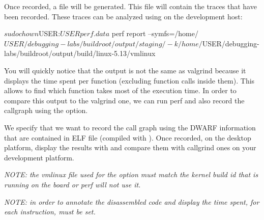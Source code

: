 Once recorded, a  file will be generated. This file will
contain the traces that have been recorded. These traces can be analyzed using
 on the development host:

\begin{bashinput}
$ sudo chown $USER:$USER perf.data
$ perf report --symfs=/home/$USER/debugging-labs/buildroot/output/staging/
    -k /home/$USER/debugging-labs/buildroot/output/build/linux-5.13/vmlinux
\end{bashinput}

You will quickly notice that the output is not the same as valgrind because it
displays the time spent per function (excluding function calls inside them).
This allows to find which function takes most of the execution time. In order to
compare this output to the valgrind one, we can run perf and also record the
callgraph using the  option.


We specify that we want to record the call graph using the DWARF information
that are contained in ELF file (compiled with ). Once recorded, on the
desktop platform, display the results with  and compare them
with callgrind ones on your development platform.

{\em NOTE: the vmlinux file used for the  option must match the kernel
build id that is running on the board or perf will not use it.}

{\em NOTE: in order to annotate the disassembled code and display the time spent,
for each instruction,  must be set.}
